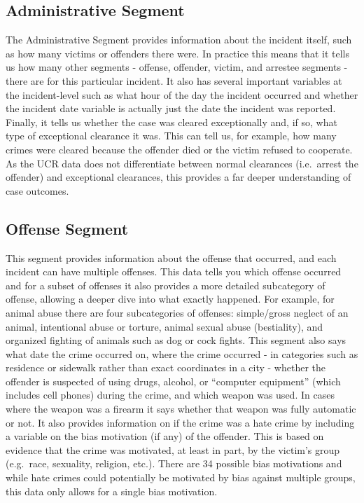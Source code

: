 \documentclass[
]{krantz}
\begin{document}
\subsection{Administrative
Segment}\label{administrative-segment}

The Administrative Segment provides information about the
incident itself, such as how many victims or offenders there
were. In practice this means that it tells us how many other
segments - offense, offender, victim, and arrestee segments
- there are for this particular incident. It also has
several important variables at the incident-level such as
what hour of the day the incident occurred and whether the
incident date variable is actually just the date the
incident was reported. Finally, it tells us whether the case
was cleared exceptionally and, if so, what type of
exceptional clearance it was. This can tell us, for example,
how many crimes were cleared because the offender died or
the victim refused to cooperate. As the UCR data does not
differentiate between normal clearances (i.e.~arrest the
offender) and exceptional clearances, this provides a far
deeper understanding of case outcomes.

\subsection{Offense Segment}\label{offense-segment}

This segment provides information about the offense that
occurred, and each incident can have multiple offenses. This
data tells you which offense occurred and for a subset of
offenses it also provides a more detailed subcategory of
offense, allowing a deeper dive into what exactly happened.
For example, for animal abuse there are four subcategories
of offenses: simple/gross neglect of an animal, intentional
abuse or torture, animal sexual abuse (bestiality), and
organized fighting of animals such as dog or cock fights.
This segment also says what date the crime occurred on,
where the crime occurred - in categories such as residence
or sidewalk rather than exact coordinates in a city -
whether the offender is suspected of using drugs, alcohol,
or ``computer equipment'' (which includes cell phones)
during the crime, and which weapon was used. In cases where
the weapon was a firearm it says whether that weapon was
fully automatic or not. It also provides information on if
the crime was a hate crime by including a variable on the
bias motivation (if any) of the offender. This is based on
evidence that the crime was motivated, at least in part, by
the victim's group (e.g.~race, sexuality, religion, etc.).
There are 34 possible bias motivations and while hate crimes
could potentially be motivated by bias against multiple
groups, this data only allows for a single bias motivation.
\end{document}
